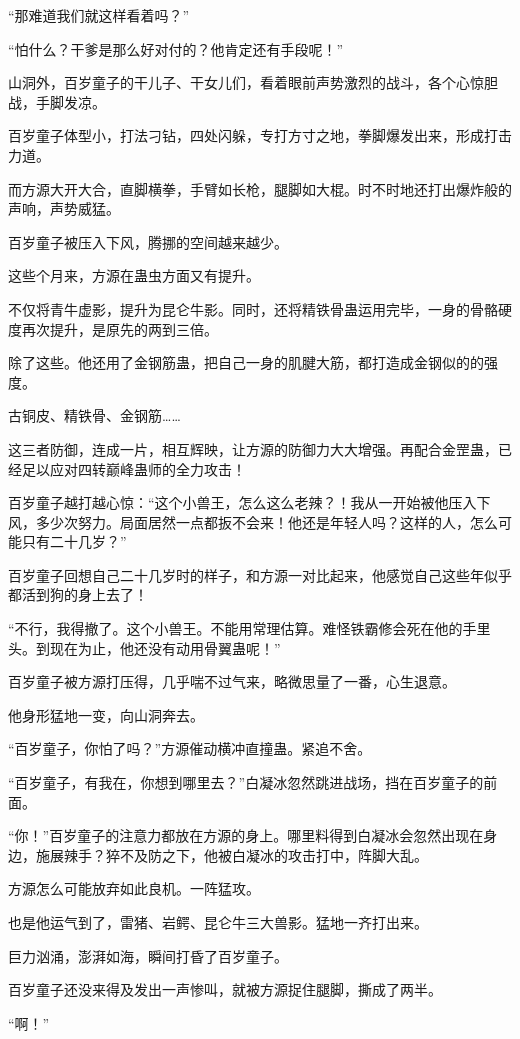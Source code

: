 \begin{this_body}
“那难道我们就这样看着吗？”

“怕什么？干爹是那么好对付的？他肯定还有手段呢！”

山洞外，百岁童子的干儿子、干女儿们，看着眼前声势激烈的战斗，各个心惊胆战，手脚发凉。

百岁童子体型小，打法刁钻，四处闪躲，专打方寸之地，拳脚爆发出来，形成打击力道。

而方源大开大合，直脚横拳，手臂如长枪，腿脚如大棍。时不时地还打出爆炸般的声响，声势威猛。

百岁童子被压入下风，腾挪的空间越来越少。

这些个月来，方源在蛊虫方面又有提升。

不仅将青牛虚影，提升为昆仑牛影。同时，还将精铁骨蛊运用完毕，一身的骨骼硬度再次提升，是原先的两到三倍。

除了这些。他还用了金钢筋蛊，把自己一身的肌腱大筋，都打造成金钢似的的强度。

古铜皮、精铁骨、金钢筋……

这三者防御，连成一片，相互辉映，让方源的防御力大大增强。再配合金罡蛊，已经足以应对四转巅峰蛊师的全力攻击！

百岁童子越打越心惊：“这个小兽王，怎么这么老辣？！我从一开始被他压入下风，多少次努力。局面居然一点都扳不会来！他还是年轻人吗？这样的人，怎么可能只有二十几岁？”

百岁童子回想自己二十几岁时的样子，和方源一对比起来，他感觉自己这些年似乎都活到狗的身上去了！

“不行，我得撤了。这个小兽王。不能用常理估算。难怪铁霸修会死在他的手里头。到现在为止，他还没有动用骨翼蛊呢！”

百岁童子被方源打压得，几乎喘不过气来，略微思量了一番，心生退意。

他身形猛地一变，向山洞奔去。

“百岁童子，你怕了吗？”方源催动横冲直撞蛊。紧追不舍。

“百岁童子，有我在，你想到哪里去？”白凝冰忽然跳进战场，挡在百岁童子的前面。

“你！”百岁童子的注意力都放在方源的身上。哪里料得到白凝冰会忽然出现在身边，施展辣手？猝不及防之下，他被白凝冰的攻击打中，阵脚大乱。

方源怎么可能放弃如此良机。一阵猛攻。

也是他运气到了，雷猪、岩鳄、昆仑牛三大兽影。猛地一齐打出来。

巨力汹涌，澎湃如海，瞬间打昏了百岁童子。

百岁童子还没来得及发出一声惨叫，就被方源捉住腿脚，撕成了两半。

“啊！”


\end{this_body}
